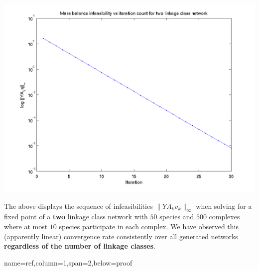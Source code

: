 \documentclass[landscape]{baposter}
\newcommand*{\0}{\mathbf{0}}
\newcommand*{\1}{\mathbf{1}}
\begin{document}
\begin{poster}
{ \includegraphics[scale=0.4]{./images/InfeasibilityVsIterationMultiple.png}
 \label{fig:typical-infeas-multiple}

 The above displays the sequence of infeasibilities
 $\|YA_kv_k\|_\infty$ when solving for a fixed point of a {\bf two} linkage class
 network with $50$ species and $500$ complexes where at most $10$ species
 participate in each complex.  We
 have observed this (apparently linear) convergence rate consistently over all
 generated networks {\bf regardless of the number of linkage classes}.
}

{name=ref,column=1,span=2,below=proof}
{
\nocite{*}  {}
}



\end{poster}
\end{document}
